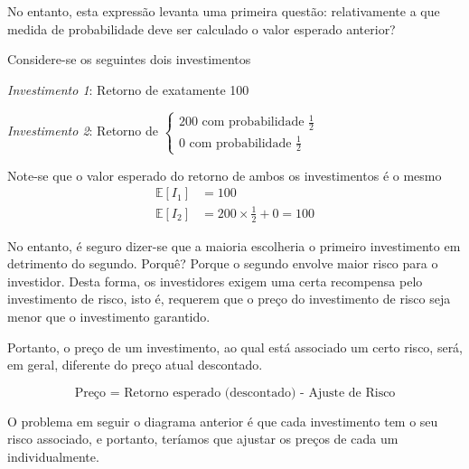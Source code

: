 \documentclass{article}
\begin{document}
\vspace{0.2cm}

No entanto, esta expressão levanta uma primeira questão: relativamente a que medida de probabilidade deve ser calculado o valor esperado anterior?

\vspace{0.5cm}

Considere-se os seguintes dois investimentos 

\vspace{0.5cm}

\textit{Investimento 1}: Retorno de exatamente 100

\vspace{0.1cm}

\textit{Investimento 2}: Retorno de 
$\begin{cases}
    200 \text{ com probabilidade } \frac{1}{2}\\
    0 \text{ com probabilidade } \frac{1}{2}
\end{cases}$

\vspace{0.25cm}

Note-se que o valor esperado do retorno de ambos os investimentos é o mesmo
\begin{align*}
    \mathbb{E}[I_1]&=100\\
    \mathbb{E}[I_2]&=200 \times \frac{1}{2}+0 =100
\end{align*}

\vspace{0.25cm}

No entanto, é seguro dizer-se que a maioria escolheria o primeiro investimento em detrimento do segundo. Porquê? Porque o segundo envolve maior risco para o investidor. Desta forma, os investidores exigem uma certa recompensa pelo investimento de risco, isto é, requerem que o preço do investimento de risco seja menor que o investimento garantido.\\

\vspace{0.25cm}

Portanto, o preço de um investimento, ao qual está associado um certo risco, será, em geral, diferente do preço atual descontado. 

$$\text{Preço = Retorno esperado (descontado) - Ajuste de Risco}$$

O problema em seguir o diagrama anterior é que cada investimento tem o seu risco associado, e portanto, teríamos que ajustar os preços de cada um individualmente.
\end{document}
